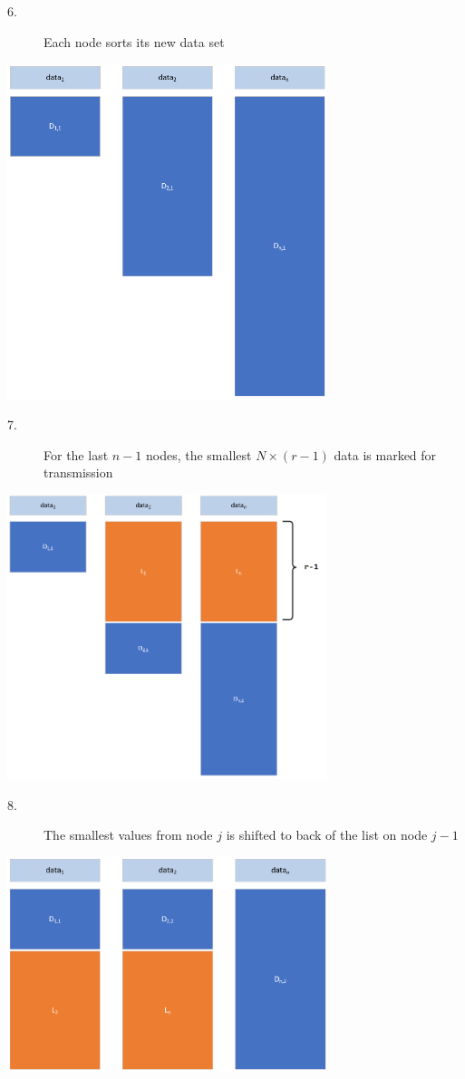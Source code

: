 \documentclass[letter]{article}
\begin{document}
\begin{description}
\item[6.]{Each node sorts its new data set}
\end{description}
\includegraphics[width=0.7\textwidth]{images/Capture4.PNG}

\begin{description}
\item[7.]{For the last $n-1$ nodes, the smallest $N \times (r-1)$ data is marked for transmission}
\end{description}
\includegraphics[width=0.7\textwidth]{images/Capture5.PNG}

\newpage

\begin{description}
\item[8.]{The smallest values from node $j$ is shifted to back of the list on node $j-1$}
\end{description}
\includegraphics[width=0.7\textwidth]{images/Capture6.PNG}
\end{document}
